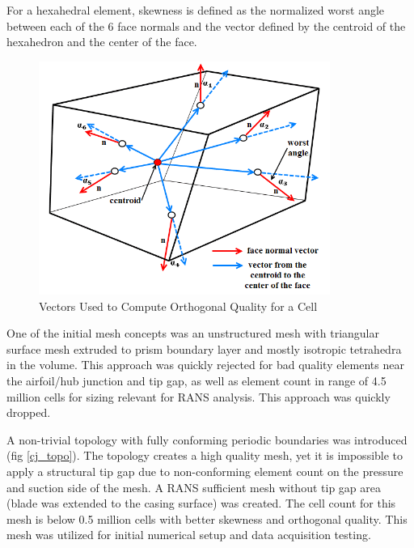 For a hexahedral element, skewness is defined as the normalized worst angle between each of the 6 face normals and the vector defined by the centroid of the hexahedron and the center of the face.

\begin{figure}[ht!]
\centering %
\includegraphics[width=0.85\textwidth]{Pictures/skew.png}
\caption{Vectors Used to Compute Orthogonal Quality for a Cell}
\label{skew}
\end{figure}



One of the initial mesh concepts was an unstructured mesh with triangular surface mesh extruded to prism boundary layer and mostly isotropic tetrahedra in the volume. This approach was quickly rejected for bad quality elements near the airfoil/hub junction and tip gap, as well as element count in range of 4.5 million cells for sizing relevant for RANS analysis. This approach was quickly dropped.

A non-trivial topology with fully conforming periodic boundaries was introduced (fig \ref{cj_topo}). The topology creates a high quality mesh, yet it is impossible to apply a structural tip gap due to non-conforming element count on the pressure and suction side of the mesh. A RANS sufficient mesh without tip gap area (blade was extended to the casing surface) was created. The cell count for this mesh is below 0.5 million cells with better skewness and orthogonal quality. This mesh was utilized for initial numerical setup and data acquisition testing.


